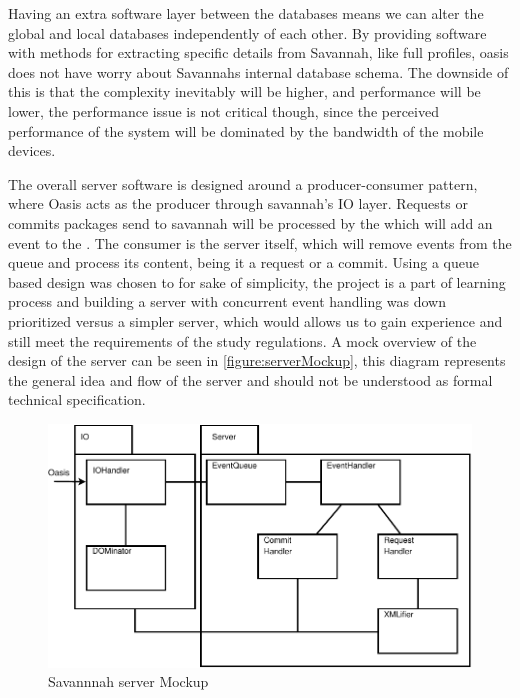Having an extra software layer between the databases means we can alter the global and local databases independently of each other. By providing software with methods for extracting specific
details from Savannah, like full profiles, oasis does not have worry about Savannahs internal database schema. The downside of this is that the complexity inevitably will be higher, and performance
will be lower, the performance issue is not critical though, since the perceived performance of the system will be dominated by the bandwidth of the mobile devices. 

The overall server software is designed around a producer-consumer pattern, where Oasis acts as the producer through savannah's IO layer.
Requests or commits packages send to savannah will be processed by the  which will add an event to the . The consumer is the server itself, which will remove events from the queue and process its content, being it a request or a commit. Using a queue based design was chosen to for sake of simplicity, the project is a part of learning process and building a server with concurrent event handling was down prioritized versus a simpler server, which would allows us to gain experience and still meet the requirements of the study regulations.
 A mock overview of the design of the server can be seen in \autoref{figure:serverMockup}, this diagram represents the general idea and flow of the server and should not be understood as formal technical specification.
\begin{figure}[H]
 \centering
  \includegraphics[scale=1]{images/savaIniDesign}
 \caption{Savannnah server Mockup}
 \label{figure:serverMockup}
\end{figure}

